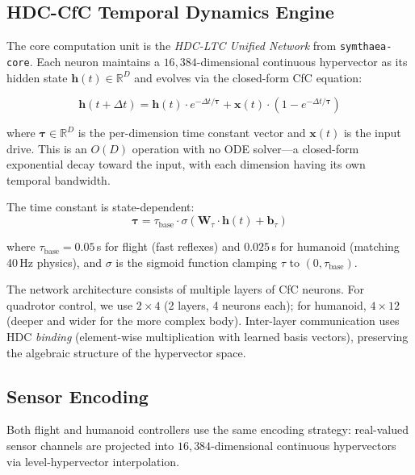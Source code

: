\documentclass[11pt,twocolumn]{article}
\newcommand{\R}{\ensuremath{\mathbb{R}}}
\newcommand{\hdcdim}{16{,}384}
\begin{document}
\subsection{HDC-CfC Temporal Dynamics Engine}
\label{sec:hdccfc}

The core computation unit is the \emph{HDC-LTC Unified Network} from \texttt{symthaea-core}. Each neuron maintains a $\hdcdim$-dimensional continuous hypervector as its hidden state $\mathbf{h}(t) \in \R^D$ and evolves via the closed-form CfC equation:

\begin{equation}
\label{eq:cfc}
\mathbf{h}(t + \Delta t) = \mathbf{h}(t) \cdot e^{-\Delta t / \boldsymbol{\tau}} + \mathbf{x}(t) \cdot (1 - e^{-\Delta t / \boldsymbol{\tau}})
\end{equation}

where $\boldsymbol{\tau} \in \R^D$ is the per-dimension time constant vector and $\mathbf{x}(t)$ is the input drive. This is an $O(D)$ operation with no ODE solver---a closed-form exponential decay toward the input, with each dimension having its own temporal bandwidth.

The time constant is state-dependent:
\begin{equation}
\boldsymbol{\tau} = \tau_{\text{base}} \cdot \sigma(\mathbf{W}_\tau \cdot \mathbf{h}(t) + \mathbf{b}_\tau)
\end{equation}

where $\tau_{\text{base}} = 0.05$\,s for flight (fast reflexes) and $0.025$\,s for humanoid (matching 40\,Hz physics), and $\sigma$ is the sigmoid function clamping $\tau$ to $(0, \tau_{\text{base}})$.

The network architecture consists of multiple layers of CfC neurons. For quadrotor control, we use $2 \times 4$ (2 layers, 4 neurons each); for humanoid, $4 \times 12$ (deeper and wider for the more complex body). Inter-layer communication uses HDC \emph{binding} (element-wise multiplication with learned basis vectors), preserving the algebraic structure of the hypervector space.

\subsection{Sensor Encoding}
\label{sec:encoding}

Both flight and humanoid controllers use the same encoding strategy: real-valued sensor channels are projected into $\hdcdim$-dimensional continuous hypervectors via level-hypervector interpolation.
\end{document}
